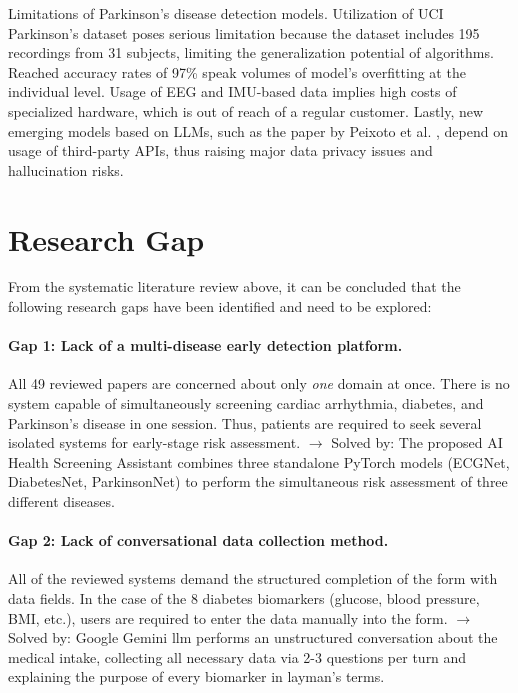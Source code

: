Limitations of Parkinson's disease detection models.
Utilization of UCI Parkinson's dataset poses serious limitation because the dataset includes 195 recordings from 31 subjects, limiting the generalization potential of algorithms. Reached accuracy rates of 97\% speak volumes of model's overfitting at the individual level. Usage of EEG and IMU-based data implies high costs of specialized hardware, which is out of reach of a regular customer. Lastly, new emerging models based on LLMs, such as the paper by Peixoto et al. \cite{peixoto2024}, depend on usage of third-party APIs, thus raising major data privacy issues and hallucination risks.
\section{Research Gap}

From the systematic literature review above, it can be concluded that the following research gaps have been identified and need to be explored:

\paragraph{Gap 1: Lack of a multi-disease early detection platform.}
All 49 reviewed papers are concerned about only \textit{one} domain at once. There is no system capable of simultaneously screening cardiac arrhythmia, diabetes, and Parkinson's disease in one session. Thus, patients are required to seek several isolated systems for early-stage risk assessment.
$\rightarrow$ Solved by: The proposed AI Health Screening Assistant combines three standalone PyTorch models (ECGNet, DiabetesNet, ParkinsonNet) to perform the simultaneous risk assessment of three different diseases.

\paragraph{Gap 2: Lack of conversational data collection method.}
All of the reviewed systems demand the structured completion of the form with data fields. In the case of the 8 diabetes biomarkers (glucose, blood pressure, BMI, etc.), users are required to enter the data manually into the form.
$\rightarrow$ Solved by: Google Gemini \ac{llm} performs an unstructured conversation about the medical intake, collecting all necessary data via 2-3 questions per turn and explaining the purpose of every biomarker in layman's terms.

